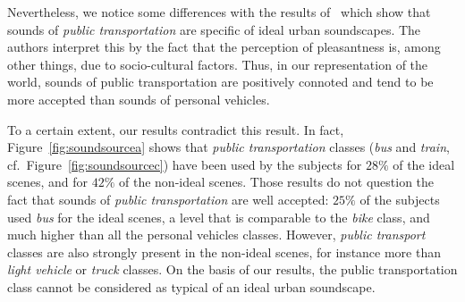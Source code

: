 \documentclass[12pt]{elsarticle}
\newcommand{\cf}{cf.}
\begin{document}

Nevertheless, we notice some differences with the results of~\cite{guastavino2006ideal} which show that sounds of \emph{public transportation} are specific of ideal urban soundscapes. The authors interpret this by the fact that the perception of pleasantness is, among other things, due to socio-cultural factors. Thus, in our representation of the world, sounds of public transportation are positively connoted and tend to be more accepted than sounds of personal vehicles.

To a certain extent, our results contradict this result. In fact,  Figure~\ref{fig:soundsourcea} shows that \emph{public transportation} classes (\emph{bus} and \emph{train}, \cf~Figure~\ref{fig:soundsourcec}) have been used by the subjects for $28\%$ of the ideal scenes, and for $42\%$ of the non-ideal scenes. Those results do not question the fact that sounds of \emph{public transportation} are well accepted: $25\%$ of the subjects used \emph{bus} for the ideal scenes, a level that is comparable to the \emph{bike} class, and much higher than all the personal vehicles classes. However, \emph{public transport} classes are also strongly present in the non-ideal scenes, for instance more than \emph{light vehicle} or \emph{truck} classes. On the basis of our results, the public transportation class cannot be considered as typical of an ideal urban soundscape.

\end{document}
